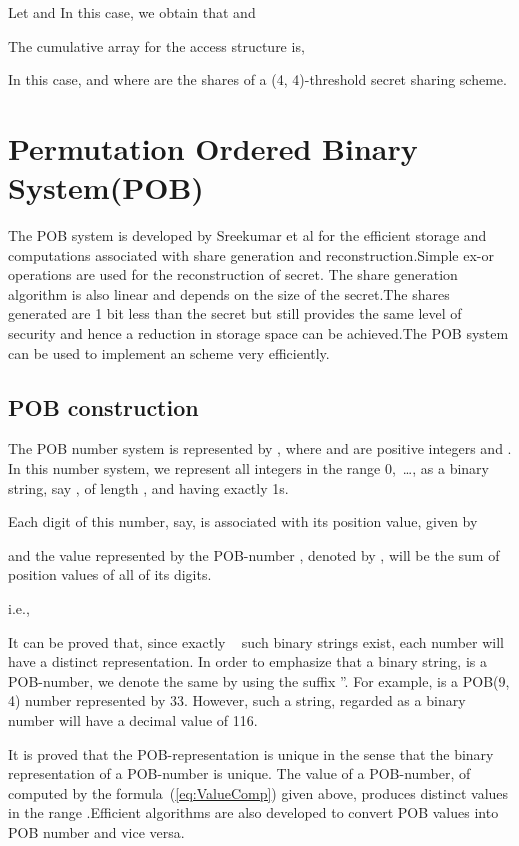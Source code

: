 \documentclass{llncs}
\newcommand{\nCr}[2] {\mbox{  }}
\begin{document}
      \begin{example}
      Let  and  In this case, we obtain that  and \mbox{}
      
      The cumulative array for the access structure  is,
      

      
      In this case, 
      and  where  are the shares of a (4, 4)-threshold secret sharing scheme.
      \end{example}
      
\section{Permutation Ordered Binary System(POB)} 
The POB system is developed by Sreekumar et al \cite{sreekumar2009efficient} for the efficient storage and computations associated with share generation and reconstruction.Simple ex-or operations are used for the reconstruction of secret. The share generation algorithm is also linear and depends on the size of the secret.The shares generated are 1 bit less than the secret but still provides the same level of security and hence a reduction in storage space can be achieved.The POB system can be used to implement an  scheme very efficiently.
\subsection{POB construction}
 The POB number system is represented by , where  and  are positive integers and . In this number system, we  represent all integers in the range \mbox{0, \ldots,} as a binary string, say , of length , and having exactly  1s.
 
 Each digit of this number, say,  is associated with its position value, given by
 
 and the value represented by the POB-number , denoted by , will be the sum of position values of all of its digits.
 
 i.e.,
 
 
 It can be proved that, since exactly  \nCr{n}{r} such binary strings exist, each number will have a distinct representation. In order to emphasize that a binary string,  is a POB-number, we denote the same by using the suffix ''. For example,  is a POB(9, 4) number represented by 33. However, such a string, regarded as a binary number will have a decimal value of 116.
 
It is  proved that the POB-representation is unique in the sense that the binary representation of a POB-number is unique.
 The value of a POB-number,  of   computed by the formula~(\ref{eq:ValueComp}) given above, produces distinct values in the range .Efficient algorithms are also developed to convert POB values into POB number and vice versa.
\end{document}
